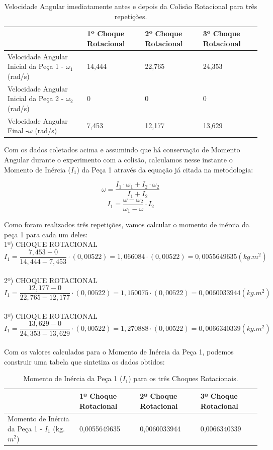 \begin{table}[H]
    \centering
    \begin{tabular}{ |M{5cm}||M{2.5cm}||M{2.5cm}||M{2.5cm}|}
        \hline
        \textbf{} & \textbf{1º Choque Rotacional} & \textbf{2º Choque Rotacional} & \textbf{3º Choque Rotacional}\\
        \hline
        Velocidade Angular Inicial da Peça 1 - $\omega_1$ (rad/s) &  14,444 &  22,765 & 24,353\\
        \hline
        Velocidade Angular Inicial da Peça 2 - $\omega_2$ (rad/s) &  0 &  0 & 0\\
        \hline
        Velocidade Angular Final -$\omega$ (rad/s) &  7,453 &  12,177 & 13,629\\
        \hline
    \end{tabular}
    \caption{Velocidade Angular imediatamente antes e depois da Colisão Rotacional para três repetições.}
\end{table}

Com os dados coletados acima e assumindo que há conservação de Momento Angular durante o experimento com a colisão, calculamos nesse instante o Momento de Inércia  ($I_1$) da Peça 1 através da equação já citada na metodologia:

\[\omega = \frac {I_1\cdot\omega_1 + I_2\cdot\omega_2}{I_1 + I_2}\]
\[I_1 = \frac {\omega - \omega_2}{\omega_1 - \omega}\cdot I_2\]

Como foram realizados três repetições, vamos calcular o momento de inércia da peça 1 para cada um deles:\\

1º) CHOQUE ROTACIONAL
\[I_1 = \frac {7,453 - 0}{14,444 - 7,453}\cdot (0,00522) = 1,066084 \cdot (0,00522) = 0,0055649635 (kg.m^2)\]\\

2º) CHOQUE ROTACIONAL
\[I_1 = \frac {12,177 - 0}{22,765 - 12,177}\cdot (0,00522) = 1,150075 \cdot (0,00522) = 0,0060033944 (kg.m^2)\]\\

3º) CHOQUE ROTACIONAL
\[I_1 = \frac {13,629 - 0}{24,353 - 13,629}\cdot (0,00522) = 1,270888 \cdot (0,00522) = 0,0066340339 (kg.m^2)\]\\

Com os valores calculados para o Momento de Inércia da Peça 1, podemos construir uma tabela que sintetiza os dados obtidos:

\begin{table}[H]
    \centering
    \begin{tabular}{ |M{5cm}||M{2.5cm}||M{2.5cm}||M{2.5cm}|  }
        \hline
        \textbf{ } & \textbf{1º Choque Rotacional} & \textbf{2º Choque Rotacional} & \textbf{3º Choque Rotacional}\\
        \hline
        Momento de Inércia da Peça 1 - $I_1$ (kg.$m^2$)  & 0,0055649635    & 0,0060033944   & 0,0066340339\\
        \hline
    \end{tabular}
    \caption{Momento de Inércia da Peça 1 ($I_1$) para os três Choques Rotacionais.}
\end{table}

